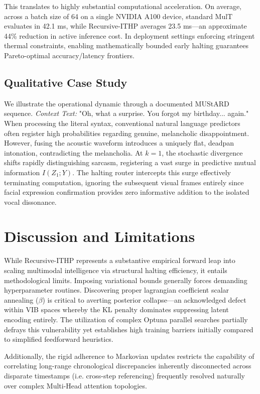 \documentclass[11pt]{article}
\begin{document}
This translates to highly substantial computational acceleration. On average, across a batch size of 64 on a single NVIDIA A100 device, standard MulT evaluates in 42.1 ms, while Recursive-ITHP averages 23.5 ms—an approximate 44\% reduction in active inference cost. In deployment settings enforcing stringent thermal constraints, enabling mathematically bounded early halting guarantees Pareto-optimal accuracy/latency frontiers.

\subsection{Qualitative Case Study}
We illustrate the operational dynamic through a documented MUStARD sequence.
\textit{Context Text:} "Oh, what a surprise. You forgot my birthday... again."
When processing the literal syntax, conventional natural language predictors often register high probabilities regarding genuine, melancholic disappointment. However, fusing the acoustic waveform introduces a uniquely flat, deadpan intonation, contradicting the melancholia. At $k=1$, the stochastic divergence shifts rapidly distinguishing sarcasm, registering a vast surge in predictive mutual information $I(Z_1; Y)$. The halting router intercepts this surge effectively terminating computation, ignoring the subsequent visual frames entirely since facial expression confirmation provides zero informative addition to the isolated vocal dissonance.

\section{Discussion and Limitations}
While Recursive-ITHP represents a substantive empirical forward leap into scaling multimodal intelligence via structural halting efficiency, it entails methodological limits. Imposing variational bounds generally forces demanding hyperparameter routines. Discovering proper lagrangian coefficient scalar annealing ($\beta$) is critical to averting posterior collapse—an acknowledged defect within VIB spaces whereby the KL penalty dominates suppressing latent encoding entirely. The utilization of complex Optuna parallel searches partially defrays this vulnerability yet establishes high training barriers initially compared to simplified feedforward heuristics. 

Additionally, the rigid adherence to Markovian updates restricts the capability of correlating long-range chronological discrepancies inherently disconnected across disparate timestamps (i.e. cross-step referencing) frequently resolved naturally over complex Multi-Head attention topologies.
\end{document}
